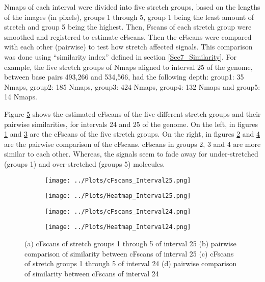 Nmaps of each \mf interval were divided into five stretch groups, based on the lengths of the images (in pixels), groups 1 through 5, group 1 being the least amount of stretch and group 5 being the highest. Then, Fscans of each stretch group were smoothed and registered to estimate cFscans. Then the cFscans were compared with each other (pairwise) to test how stretch affected signals. This comparison was done using ``similarity index'' defined in section \ref{Sec7_Similarity}. For example, the five stretch groups of Nmaps aligned to interval 25 of the \mf genome, between base pairs 493,266 and 534,566, had the following depth: group1: 35 Nmaps, group2: 185 Nmaps, group3: 424 Nmaps, group4: 132 Nmaps and group5: 14 Nmaps. 

Figure \ref{fig:Stretch} shows the estimated cFscans of the five different stretch groups and their pairwise similarities, for intervals 24 and 25 of the \mf genome. On the left, in figures \ref{fig:Stretch_a} and \ref{fig:Stretch_c} are the cFscans of the five stretch groups. On the right, in figures \ref{fig:Stretch_b} and \ref{fig:Stretch_d} are the pairwise comparison of the cFscans. cFscans in groups 2, 3 and 4 are more similar to each other. Whereas, the signals seem to fade away for under-stretched (groups 1) and over-stretched (groups 5) molecules. 

\begin{figure}[H]
\centering
\begin{subfigure}{0.45\linewidth}
\texttt{[image: ../Plots/cFscans\_Interval25.png]}
\caption{}
\label{fig:Stretch_a}
\end{subfigure}
\begin{subfigure}{0.45\linewidth}
\vspace{0.25cm}
\texttt{[image: ../Plots/Heatmap\_Interval25.png]} \\
\caption{}
\label{fig:Stretch_b}
\end{subfigure}
\begin{subfigure}{0.45\linewidth}
\texttt{[image: ../Plots/cFscans\_Interval24.png]}
\caption{}
\label{fig:Stretch_c}
\end{subfigure}
\begin{subfigure}{0.45\linewidth}
\texttt{[image: ../Plots/Heatmap\_Interval24.png]}
\caption{}
\label{fig:Stretch_d}
\end{subfigure}
\caption{(a) cFscans of stretch groups 1 through 5 of \mf interval 25 (b) pairwise comparison of similarity between cFscans of \mf interval 25 (c) cFscans of stretch groups 1 through 5 of \mf interval 24 (d) pairwise comparison of similarity between cFscans of \mf interval 24} 
\label{fig:Stretch}
\end{figure}

